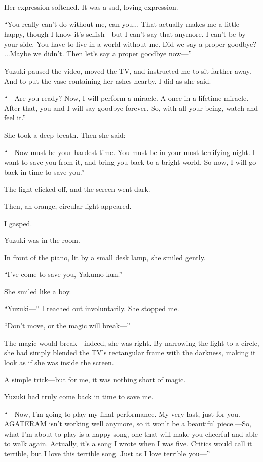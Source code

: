 \documentclass[
    a4paper,
    12pt,
    twoside,
    openany,
    UTF8,
    fontset=windows
]{ctexbook}
\begin{document}
Her expression softened. It was a sad, loving expression.

``You really can't do without me, can you... That actually makes me a little happy, though I know it's selfish---but I can't say that anymore. I can't be by your side. You have to live in a world without me. Did we say a proper goodbye? ...Maybe we didn't. Then let's say a proper goodbye now---''

Yuzuki paused the video, moved the TV, and instructed me to sit farther away. And to put the vase containing her ashes nearby. I did as she said.

``---Are you ready? Now, I will perform a miracle. A once-in-a-lifetime miracle. After that, you and I will say goodbye forever. So, with all your being, watch and feel it.''

She took a deep breath. Then she said:

``---Now must be your hardest time. You must be in your most terrifying night. I want to save you from it, and bring you back to a bright world. So now, I will go back in time to save you.''

The light clicked off, and the screen went dark.

Then, an orange, circular light appeared.

I gasped.

Yuzuki was in the room.

In front of the piano, lit by a small desk lamp, she smiled gently.

``I've come to save you, Yakumo-kun.''

She smiled like a boy.

``Yuzuki---'' I reached out involuntarily. She stopped me.

``Don't move, or the magic will break---''

The magic would break---indeed, she was right. By narrowing the light to a circle, she had simply blended the TV's rectangular frame with the darkness, making it look as if she was inside the screen.

A simple trick---but for me, it was nothing short of magic.

Yuzuki had truly come back in time to save me.

``---Now, I'm going to play my final performance. My very last, just for you. AGATERAM isn't working well anymore, so it won't be a beautiful piece.---So, what I'm about to play is a happy song, one that will make you cheerful and able to walk again. Actually, it's a song I wrote when I was five. Critics would call it terrible, but I love this terrible song. Just as I love terrible you---''
\end{document}
